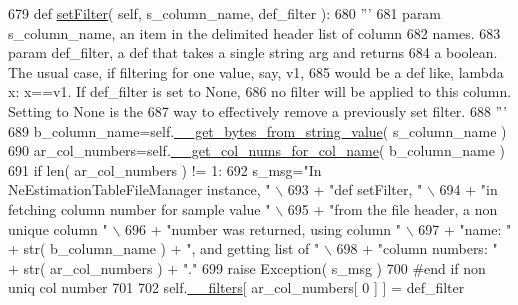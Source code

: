 \begin{DoxyCode}
679     \textcolor{keyword}{def }\hyperlink{classnegui_1_1pgneestimationtablefilemanager_1_1NeEstimationTableFileManager_a462d00e75c4a2d24909a90282b4e33e8}{setFilter}( self, s\_column\_name, def\_filter ):
680         \textcolor{stringliteral}{'''}
681 \textcolor{stringliteral}{        param s\_column\_name, an item in the delimited header list of column}
682 \textcolor{stringliteral}{            names.}
683 \textcolor{stringliteral}{        param def\_filter, a def that takes a single string arg and returns}
684 \textcolor{stringliteral}{            a boolean.  The usual case, if filtering for one value, say, v1,}
685 \textcolor{stringliteral}{            would be a def like, lambda x: x==v1. If def\_filter is set to None, }
686 \textcolor{stringliteral}{            no filter will be applied to this column. Setting to None is the }
687 \textcolor{stringliteral}{            way to effectively remove a previously set filter.}
688 \textcolor{stringliteral}{        '''}
689         b\_column\_name=self.\hyperlink{classnegui_1_1pgneestimationtablefilemanager_1_1NeEstimationTableFileManager_a6972a6427caa8ee539b1e8959bcc93b6}{\_\_get\_bytes\_from\_string\_value}( s\_column\_name )
690         ar\_col\_numbers=self.\hyperlink{classnegui_1_1pgneestimationtablefilemanager_1_1NeEstimationTableFileManager_a51fb7d8e34c1bc2abf92209f0930c8e0}{\_\_get\_col\_nums\_for\_col\_name}( b\_column\_name )
691         \textcolor{keywordflow}{if} len( ar\_col\_numbers ) != 1:
692             s\_msg=\textcolor{stringliteral}{"In NeEstimationTableFileManager instance, "} \(\backslash\)
693                             + \textcolor{stringliteral}{"def setFilter, "} \(\backslash\)
694                             + \textcolor{stringliteral}{"in fetching column number for sample value "} \(\backslash\)
695                             + \textcolor{stringliteral}{"from the file header, a non unique column "} \(\backslash\)
696                             + \textcolor{stringliteral}{"number was returned, using column "} \(\backslash\)
697                             + \textcolor{stringliteral}{"name: "} + str( b\_column\_name ) + \textcolor{stringliteral}{", and getting list of "} \(\backslash\)
698                             + \textcolor{stringliteral}{"column numbers: "} + str( ar\_col\_numbers ) + \textcolor{stringliteral}{"."}
699             \textcolor{keywordflow}{raise} Exception( s\_msg )
700         \textcolor{comment}{#end if non uniq col number}
701 
702         self.\hyperlink{classnegui_1_1pgneestimationtablefilemanager_1_1NeEstimationTableFileManager_a3a7a1e43a9a60b8de5b2259fc4014ca4}{\_\_filters}[ ar\_col\_numbers[ 0 ] ] = def\_filter
\end{DoxyCode}
